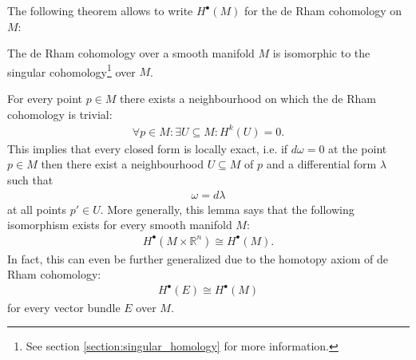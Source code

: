 

    The following theorem allows to write $H^\bullet(M)$ for the de Rham cohomology on $M$:
    \begin{theorem}[de Rham]
        The de Rham cohomology over a smooth manifold $M$ is isomorphic to the singular cohomology\footnote{See section \ref{section:singular_homology} for more information.} over $M$.
    \end{theorem}

    \begin{theorem}\label{diff:poincare}
         For every point $p\in M$ there exists a neighbourhood on which the de Rham cohomology is trivial:
        \begin{gather}
            \forall p\in M:\exists U\subseteq M: H^k(U) = 0.
        \end{gather}
        This implies that every closed form is locally exact, i.e. if $d\omega=0$ at the point $p\in M$ then there exist a neighbourhood $U\subseteq M$ of $p$ and a differential form $\lambda$ such that
        \begin{gather}
            \omega = d\lambda
        \end{gather}
        at all points $p'\in U$. More generally, this lemma says that the following isomorphism exists for every smooth manifold $M$:
        \begin{gather}
            H^\bullet(M\times\mathbb{R}^n) \cong H^\bullet(M).
        \end{gather}
        In fact, this can even be further generalized due to the homotopy axiom of de Rham cohomology:
        \begin{gather}
            H^\bullet(E) \cong H^\bullet(M)
        \end{gather}
        for every vector bundle $E$ over $M$.
    \end{theorem}

